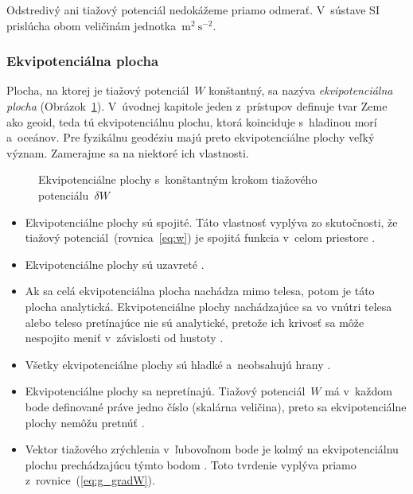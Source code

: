 \documentclass[a4paper,12pt]{book}
\begin{document}
Odstredivý ani tiažový potenciál nedokážeme priamo odmerať.  V~sústave SI 
prislúcha obom veličinám jednotka~$\mathrm{m}^2 \ \mathrm{s}^{-2}$.

\subsubsection{Ekvipotenciálna plocha}
\label{sec:equipotential_surface}

Plocha, na ktorej je tiažový potenciál~$W$ konštantný, sa nazýva 
\emph{ekvipotenciálna plocha} (Obrázok~\ref{fig:equipotential_surfaces}).
V~úvodnej kapitole jeden z~prístupov definuje tvar Zeme ako geoid, teda tú
ekvipotenciálnu plochu, ktorá koinciduje s~hladinou morí a~oceánov.  Pre
fyzikálnu geodéziu majú preto ekvipotenciálne plochy veľký význam.  Zamerajme
sa na niektoré ich vlastnosti.

\begin{figure}
\centering

\caption{Ekvipotenciálne plochy s~konštantným krokom tiažového 
potenciálu~$\delta W$}
\label{fig:equipotential_surfaces}
\end{figure}

\begin{itemize}
\item Ekvipotenciálne plochy sú spojité.  Táto vlastnosť vyplýva zo
skutočnosti, že tiažový potenciál~(rovnica~\ref{eq:w}) je spojitá funkcia 
v~celom priestore \parencite{Janak2006}.

\item Ekvipotenciálne plochy sú uzavreté \parencite{VanicekGeodesy}.

\item Ak sa celá ekvipotenciálna plocha nachádza mimo telesa, potom je táto 
plocha analytická.  Ekvipotenciálne plochy nachádzajúce sa vo vnútri telesa 
alebo teleso pretínajúce nie sú analytické, pretože ich krivosť sa môže 
nespojito meniť v~závislosti od hustoty \parencite{MoritzPhysicalGeodesy}.

\item Všetky ekvipotenciálne plochy sú hladké a~neobsahujú hrany
\parencite{MoritzPhysicalGeodesy}.

\item Ekvipotenciálne plochy sa nepretínajú.  Tiažový potenciál~$W$ má v~každom
bode definované práve jedno číslo (skalárna veličina), preto sa ekvipotenciálne
plochy nemôžu pretnúť \parencite{MacMillan1930}.

\item Vektor tiažového zrýchlenia v~ľubovoľnom bode je kolmý na ekvipotenciálnu
plochu prechádzajúcu týmto bodom \parencite{MoritzPhysicalGeodesy}.  Toto 
tvrdenie vyplýva priamo z~rovnice~(\ref{eq:g_gradW}).
\end{itemize}
\end{document}
